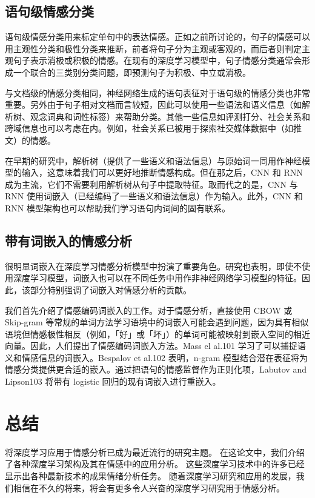 \documentclass[lang=cn,11pt,a4paper]{elegantpaper}
\begin{document}
\subsection{语句级情感分类}
语句级情感分类用来标定单句中的表达情感。正如之前所讨论的，句子的情感可以用主观性分类和极性分类来推断，前者将句子分为主观或客观的，而后者则判定主观句子表示消极或积极的情感。在现有的深度学习模型中，句子情感分类通常会形成一个联合的三类别分类问题，即预测句子为积极、中立或消极。

与文档级的情感分类相同，神经网络生成的语句表征对于语句级的情感分类也非常重要。另外由于句子相对文档而言较短，因此可以使用一些语法和语义信息（如解析树、观念词典和词性标签）来帮助分类。其他一些信息如评测打分、社会关系和跨域信息也可以考虑在内。例如，社会关系已被用于探索社交媒体数据中（如推文）的情感。

在早期的研究中，解析树（提供了一些语义和语法信息）与原始词一同用作神经模型的输入，这意味着我们可以更好地推断情感构成。但在那之后，CNN 和 RNN 成为主流，它们不需要利用解析树从句子中提取特征。取而代之的是，CNN 与 RNN 使用词嵌入（已经编码了一些语义和语法信息）作为输入。此外，CNN 和 RNN 模型架构也可以帮助我们学习语句内词间的固有联系。

\subsection{带有词嵌入的情感分析}
很明显词嵌入在深度学习情感分析模型中扮演了重要角色。研究也表明，即使不使用深度学习模型，词嵌入也可以在不同任务中用作非神经网络学习模型的特征。因此，该部分特别强调了词嵌入对情感分析的贡献。

我们首先介绍了情感编码词嵌入的工作。对于情感分析，直接使用 CBOW 或 Skip-gram 等常规的单词方法学习语境中的词嵌入可能会遇到问题，因为具有相似语境但情感极性相反（例如，「好」或「坏」）的单词可能被映射到嵌入空间的相近向量。因此，人们提出了情感编码词嵌入方法。Mass el al.101 学习了可以捕捉语义和情感信息的词嵌入。Bespalov et al.102 表明，n-gram 模型结合潜在表征将为情感分类提供更合适的嵌入。通过把语句的情感监督作为正则化项，Labutov and Lipson103 将带有 logistic 回归的现有词嵌入进行重嵌入。

\section{总结}
将深度学习应用于情感分析已成为最近流行的研究主题。 在这论文中，我们介绍了各种深度学习架构及其在情感中的应用分析。 这些深度学习技术中的许多已经显示出各种最新技术的成果情绪分析任务。 随着深度学习研究和应用的发展，我们相信在不久的将来，将会有更多令人兴奋的深度学习研究用于情感分析。


\end{document}
